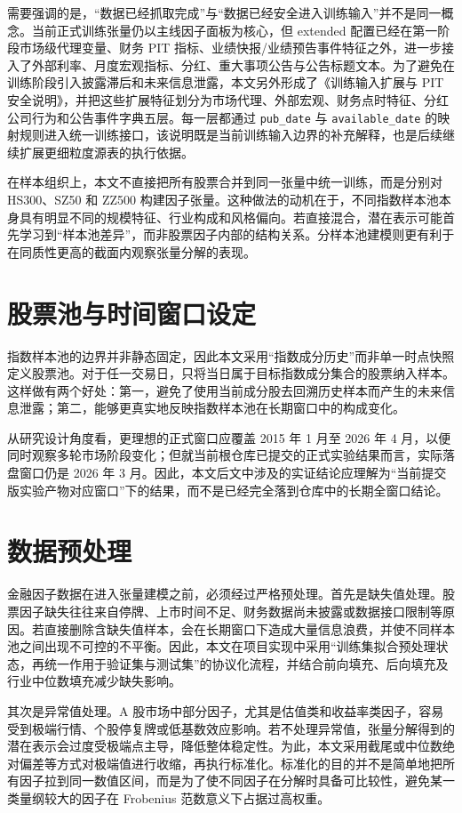 需要强调的是，“数据已经抓取完成”与“数据已经安全进入训练输入”并不是同一概念。当前正式训练张量仍以主线因子面板为核心，但 extended 配置已经在第一阶段市场级代理变量、财务 PIT 指标、业绩快报/业绩预告事件特征之外，进一步接入了外部利率、月度宏观指标、分红、重大事项公告与公告标题文本。为了避免在训练阶段引入披露滞后和未来信息泄露，本文另外形成了《训练输入扩展与 PIT 安全说明》，并把这些扩展特征划分为市场代理、外部宏观、财务点时特征、分红公司行为和公告事件字典五层。每一层都通过 \texttt{pub\_date} 与 \texttt{available\_date} 的映射规则进入统一训练接口，该说明既是当前训练输入边界的补充解释，也是后续继续扩展更细粒度源表的执行依据。

在样本组织上，本文不直接把所有股票合并到同一张量中统一训练，而是分别对 HS300、SZ50 和 ZZ500 构建因子张量。这种做法的动机在于，不同指数样本池本身具有明显不同的规模特征、行业构成和风格偏向。若直接混合，潜在表示可能首先学习到“样本池差异”，而非股票因子内部的结构关系。分样本池建模则更有利于在同质性更高的截面内观察张量分解的表现。

\section{股票池与时间窗口设定}

指数样本池的边界并非静态固定，因此本文采用“指数成分历史”而非单一时点快照定义股票池。对于任一交易日，只将当日属于目标指数成分集合的股票纳入样本。这样做有两个好处：第一，避免了使用当前成分股去回溯历史样本而产生的未来信息泄露；第二，能够更真实地反映指数样本池在长期窗口中的构成变化。

从研究设计角度看，更理想的正式窗口应覆盖 2015 年 1 月至 2026 年 4 月，以便同时观察多轮市场阶段变化；但就当前根仓库已提交的正式实验结果而言，实际落盘窗口仍是 2026 年 3 月。因此，本文后文中涉及的实证结论应理解为“当前提交版实验产物对应窗口”下的结果，而不是已经完全落到仓库中的长期全窗口结论。

\section{数据预处理}

金融因子数据在进入张量建模之前，必须经过严格预处理。首先是缺失值处理。股票因子缺失往往来自停牌、上市时间不足、财务数据尚未披露或数据接口限制等原因。若直接删除含缺失值样本，会在长期窗口下造成大量信息浪费，并使不同样本池之间出现不可控的不平衡。因此，本文在项目实现中采用“训练集拟合预处理状态，再统一作用于验证集与测试集”的协议化流程，并结合前向填充、后向填充及行业中位数填充减少缺失影响。

其次是异常值处理。A 股市场中部分因子，尤其是估值类和收益率类因子，容易受到极端行情、个股停复牌或低基数效应影响。若不处理异常值，张量分解得到的潜在表示会过度受极端点主导，降低整体稳定性。为此，本文采用截尾或中位数绝对偏差等方式对极端值进行收缩，再执行标准化。标准化的目的并不是简单地把所有因子拉到同一数值区间，而是为了使不同因子在分解时具备可比较性，避免某一类量纲较大的因子在 Frobenius 范数意义下占据过高权重。

